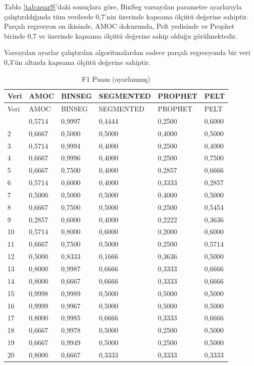\documentclass[12pt,twoside]{deuthesis}
\begin{document}
Tablo \ref{tab:nvar9}'daki sonuçlara göre, BinSeg varsayılan parametre ayarlarıyla çalıştırıldığında tüm verilerde 0,7'nin üzerinde kapsama ölçütü değerine sahiptir. Parçalı regresyon on ikisinde, AMOC dokuzunda, Pelt yedisinde ve Prophet birinde 0,7 ve üzerinde kapsama ölçütü değerine sahip olduğu görülmektedir.

Varsayılan ayarlar çalıştırılan algoritmalardan sadece parçalı regresyonda bir veri 0,3'ün altında kapsama ölçütü değerine sahiptir.

\begin{longtable}[]{@{}llllll@{}}
\caption{\label{tab:nvar10} F1 Puanı (ayarlanmış)}\tabularnewline
\toprule\noalign{}
Veri & AMOC & BINSEG & SEGMENTED & PROPHET & PELT \\
\midrule\noalign{}
\endfirsthead
\toprule\noalign{}
Veri & AMOC & BINSEG & SEGMENTED & PROPHET & PELT \\
\midrule\noalign{}
\endhead
\bottomrule\noalign{}
\endlastfoot
1 & 0,5714 & 0,9997 & 0,4444 & 0,2500 & 0,6000 \\
2 & 0,6667 & 0,5000 & 0,5000 & 0,4000 & 0,5000 \\
3 & 0,5714 & 0,9994 & 0,4000 & 0,2500 & 0,4000 \\
4 & 0,6667 & 0,9996 & 0,4000 & 0,2500 & 0,7500 \\
5 & 0,6667 & 0,7500 & 0,4000 & 0,2857 & 0,6666 \\
6 & 0,5714 & 0,6000 & 0,4000 & 0,3333 & 0,2857 \\
7 & 0,5000 & 0,5000 & 0,5000 & 0,4000 & 0,5000 \\
8 & 0,6667 & 0,7500 & 0,5000 & 0,2500 & 0,5454 \\
9 & 0,2857 & 0,6000 & 0,4000 & 0,2222 & 0,3636 \\
10 & 0,5714 & 0,8000 & 0,6000 & 0,2000 & 0,6000 \\
11 & 0,6667 & 0,7500 & 0,5000 & 0,2500 & 0,5714 \\
12 & 0,5000 & 0,8333 & 0,1666 & 0,3636 & 0,5000 \\
13 & 0,8000 & 0,9987 & 0,6666 & 0,3333 & 0,6666 \\
14 & 0,8000 & 0,6667 & 0,6666 & 0,3333 & 0,6666 \\
15 & 0,9998 & 0,9989 & 0,5000 & 0,5000 & 0,5000 \\
16 & 0,9999 & 0,9967 & 0,5000 & 0,5000 & 0,5000 \\
17 & 0,8000 & 0,9985 & 0,6666 & 0,3333 & 0,6666 \\
18 & 0,6667 & 0,9978 & 0,5000 & 0,2500 & 0,5000 \\
19 & 0,6667 & 0,9949 & 0,5000 & 0,2500 & 0,5000 \\
20 & 0,8000 & 0,6667 & 0,3333 & 0,3333 & 0,3333 \\
\end{longtable}
\end{document}
